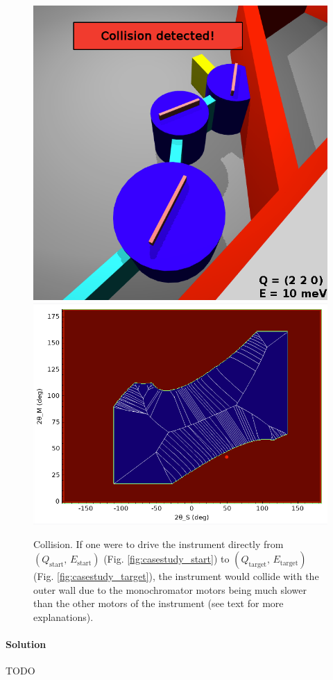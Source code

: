 \begin{figure}[H]
		\begin{center}
			\includegraphics[width = 0.4 \textwidth]{figures/casestudy_2_2_0_10meV}
			\hspace{0.5cm}
			\includegraphics[width = 0.55 \textwidth]{figures/casestudy_2_2_0_10meV_cfg}
		\end{center}
	\caption[Case study: Collision.]{Collision. 
		If one were to drive the instrument directly from $\left(Q_\mathrm{start},\, E_\mathrm{start}\right)$ (Fig. \ref{fig:casestudy_start})
		to $\left(Q_\mathrm{target},\, E_\mathrm{target}\right)$ (Fig. \ref{fig:casestudy_target}), the instrument 
		would collide with the outer wall due to the monochromator motors being much slower than the other 
		motors of the instrument (see text for more explanations).
		\label{fig:casestudy_collision}}
\end{figure}


\paragraph{Solution}
TODO


